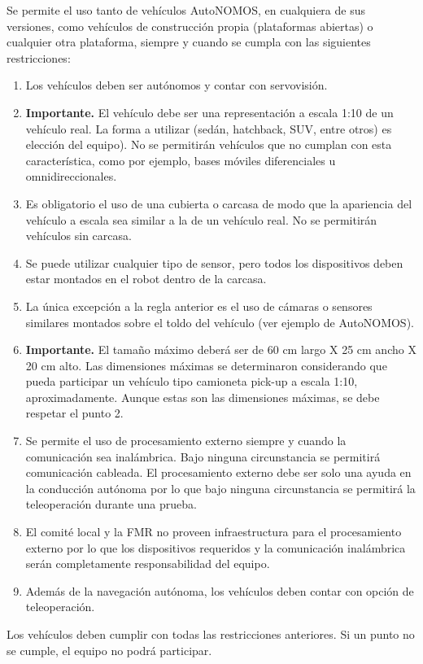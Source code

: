 \documentclass[letterpaper,12pt]{article}
\begin{document}
Se permite el uso tanto de vehículos AutoNOMOS, en cualquiera de sus versiones, como vehículos de construcción propia (plataformas abiertas) o cualquier otra plataforma, siempre y cuando se cumpla con las siguientes restricciones:
\begin{enumerate}
\item Los vehículos deben ser autónomos y contar con servovisión.
\item \textbf{Importante. } El vehículo debe ser una representación a escala 1:10 de un vehículo real. La forma a utilizar (sedán, hatchback, SUV, entre otros) es elección del equipo). No se permitirán vehículos que no cumplan con esta característica, como por ejemplo, bases móviles diferenciales u omnidireccionales.
\item Es obligatorio el uso de una cubierta o carcasa de modo que la apariencia del vehículo a escala sea similar a la de un vehículo real. No se permitirán vehículos sin carcasa.
\item Se puede utilizar cualquier tipo de sensor, pero todos los dispositivos deben estar montados en el robot dentro de la carcasa.
\item La única excepción a la regla anterior es el uso de cámaras o sensores similares montados sobre el toldo del vehículo (ver ejemplo de AutoNOMOS).
\item \textbf{Importante.} El tamaño máximo deberá ser de 60 cm largo X 25 cm ancho X 20 cm alto. Las dimensiones máximas se determinaron considerando que pueda participar un vehículo tipo camioneta pick-up a escala 1:10, aproximadamente. Aunque estas son las dimensiones máximas, se debe respetar el punto 2. 
\item Se permite el uso de procesamiento externo siempre y cuando la comunicación sea inalámbrica. Bajo ninguna circunstancia se permitirá comunicación cableada. El procesamiento externo debe ser solo una ayuda en la conducción autónoma por lo que bajo ninguna circunstancia se permitirá la teleoperación durante una prueba.
\item El comité local y la FMR no proveen infraestructura para el procesamiento externo por lo que los dispositivos requeridos y la comunicación inalámbrica serán completamente responsabilidad del equipo.
\item Además de la navegación autónoma, los vehículos deben contar con opción de teleoperación. 
\end{enumerate}
Los vehículos deben cumplir con todas las restricciones anteriores. Si un punto no se cumple, el equipo no podrá participar. 
\end{document}
